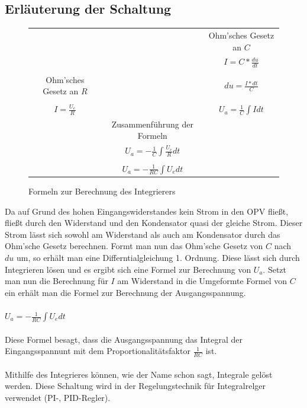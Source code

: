 \subsection{Erl\"auterung der Schaltung}
\begin{figure}[H]
  \centering
  \begin{tabular}{ccc}
    & & Ohm'sches Gesetz an $C$ \\
    & & $I=C*\frac{du}{dt}$ \\ \\
    Ohm'sches Gesetz an $R$& & $du = \frac{I*dt}{C}$ \\ \\
    $I=\frac{U_e}{R}$ & & $U_a=\frac{1}{C}\int I dt$ \\
    & Zusammenf\"uhrung der Formeln & \\
    & $U_a = -\frac{1}{C} \int \frac{U_e}{R} dt$ & \\ \\
    & $U_a = -\frac{1}{RC} \int U_e dt$ & \\
  \end{tabular}
  \caption{Formeln zur Berechnung des Integrierers}
\end{figure}
\noindent
Da auf Grund des hohen Eingangswiderstandes kein Strom in den OPV flie\ss{}t, flie\ss{}t durch den Widerstand und den Kondensator quasi der gleiche Strom. Dieser Strom l\"asst sich sowohl am Widerstand als auch am Kondensator durch das Ohm'sche Gesetz berechnen. Formt man nun das Ohm'sche Gesetz von $C$ nach $du$ um, so erh\"alt man eine Differntialgleichung 1. Ordnung. Diese l\"asst sich durch Integrieren l\"osen und es ergibt sich eine Formel zur Berechnung von $U_a$. Setzt man nun die Berechnung f\"ur $I$ am Widerstand in die Umgeformte Formel von $C$ ein erh\"alt man die Formel zur Berechnung der Ausgangsspannung. \\ \\
$U_a = -\frac{1}{RC} \int U_e dt$ \\  \\
Diese Formel besagt, dass die Ausgangsspannung das Integral der Eingangsspannunt mit dem Proportionalit\"atsfaktor $\frac{1}{RC}$ ist. \\ \\
Mithilfe des Integrieres k\"onnen, wie der Name schon sagt, Integrale gel\"ost werden. Diese Schaltung wird in der Regelungstechnik f\"ur Integralrelger verwendet (PI-, PID-Regler).

\newpage

